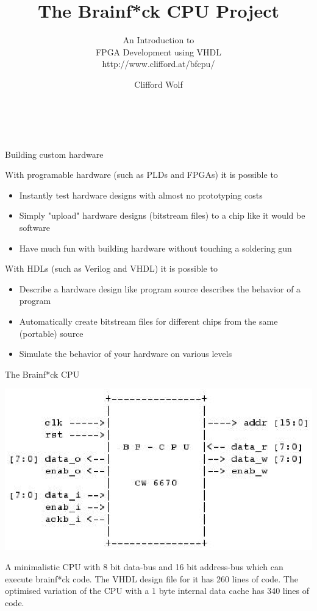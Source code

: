 \documentclass[pdf]{prosper}
\title{The Brainf*ck CPU Project}
\subtitle{An Introduction to \\ FPGA Development using VHDL \\
http://www.clifford.at/bfcpu/}
\author{Clifford Wolf\\
\institution{ROCK Linux - \href{http://www.rocklinux.org}{http://www.rocklinux.org}}\\
\institution{CNGW - \href{http://www.cngw.org}{http://www.cngw.orig}}\\
\institution{LINBIT - \href{http://www.linbit.com}{http://www.linbit.com}}}
\begin{document}
\maketitle



\begin{slide}{Building custom hardware}

With programable hardware (such as PLDs and FPGAs) it is possible to
\begin{itemize}
\item Instantly test hardware designs with almost no prototyping costs
\item Simply "upload" hardware designs (bitstream files) to a chip like it would be software
\item Have much fun with building hardware without touching a soldering gun
\end{itemize}

\vspace*{1cm}

With HDLs (such as Verilog and VHDL) it is possible to
\begin{itemize}
\item Describe a hardware design like program source describes the behavior of a program
\item Automatically create bitstream files for different chips from the same (portable) source
\item Simulate the behavior of your hardware on various levels
\end{itemize}

\end{slide}

\begin{slide}{The Brainf*ck CPU}

\includegraphics[scale=.80]{schem.eps}

A minimalistic CPU with 8 bit data-bus and 16 bit address-bus which can
execute brainf*ck code. The VHDL design file for it has 260 lines of
code. The optimised variation of the CPU with a 1 byte internal data
cache has 340 lines of code.

\end{slide}
\end{document}
